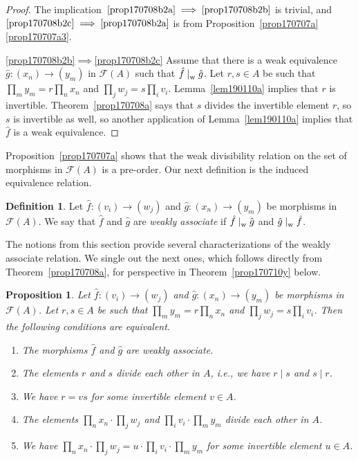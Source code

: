 \documentclass[reqno]{amsart}
\theoremstyle{plain}
\newtheorem{prop}[lem]{Proposition}
\theoremstyle{definition}
\newtheorem{defn}[lem]{Definition}
\newcommand{\cat}[1]{\mathcal{#1}}
\newcommand{\catf}{\cat{F}}
\numberwithin{equation}{lem}
\newcommand{\divs}{\mid_{\text w}^{}}
\begin{document}
\begin{proof}
The  implication~$\eqref{prop170708b2a}\implies\eqref{prop170708b2b}$ is trivial,
and~$\eqref{prop170708b2c}\implies\eqref{prop170708b2a}$ is from Proposition~\ref{prop170707a}\eqref{prop170707a3}.

\eqref{prop170708b2b}$\implies$\eqref{prop170708b2c} Assume that there is a weak equivalence $\hat g\colon (x_n)\to(y_m)$
in $\catf(A)$  such that $\hat f\divs\hat g$.
Let $r,s\in A$ be such that $\prod_my_m=r\prod_nx_n$ and $\prod_jw_j=s\prod_iv_i$.
Lemma~\ref{lem190110a} implies that $r$ is invertible.
Theorem~\ref{prop170708a} says that $s$ divides the invertible element $r$, so $s$ is invertible as well,
so another application of Lemma~\ref{lem190110a} implies that $\hat f$ is a weak equivalence.
\end{proof}


Proposition~\ref{prop170707a}
shows that the weak divisibility relation on the set of morphisms in
$\catf(A)$ is a pre-order. Our next definition is the induced equivalence relation.

\begin{defn}\label{defn170715a}
Let $\hat f\colon (v_i)\to(w_j)$ and $\hat g\colon (x_n)\to(y_m)$ be morphisms in $\catf(A)$.
We say that $\hat f$ and $\hat g$ are
\emph{weakly associate}
if
$\hat f\divs\hat g$ and $\hat g\divs\hat f$.
\end{defn}



The notions from this section provide several characterizations of the weakly associate relation.
We single out the next 
ones,
which follows directly from Theorem~\ref{prop170708a}, for 
perspective
in Theorem~\ref{prop170710y} below.

\begin{prop}\label{prop170715a}
Let
$\hat f\colon (v_i)\to(w_j)$ and $\hat g\colon (x_n)\to(y_m)$ 
be morphisms in $\catf(A)$. 
Let $r,s\in A$ be such that $\prod_my_m=r\prod_nx_n$ and $\prod_jw_j=s\prod_iv_i$.
Then the following conditions are equivalent.
\begin{enumerate}[\rm(i)]
\item \label{prop170715a1}
The morphisms $\hat f$ and $\hat g$ are weakly associate.
\item \label{prop170715a4}
The elements $r$ and $s$ divide each other in $A$, i.e., we have $r\mid s$ and $s\mid r$.
\item \label{prop170715a5}
We have $r=vs$ for some invertible element $v\in A$.
\item \label{prop170715a2}
The elements $\prod_nx_n\cdot\prod_jw_j$ and $\prod_iv_i\cdot\prod_my_m$ divide each other in $A$.
\item \label{prop170715a3}
We have $\prod_nx_n\cdot\prod_jw_j=u\cdot\prod_iv_i\cdot\prod_my_m$
for some invertible element $u\in A$.
\end{enumerate}
\end{prop}
\end{document}
